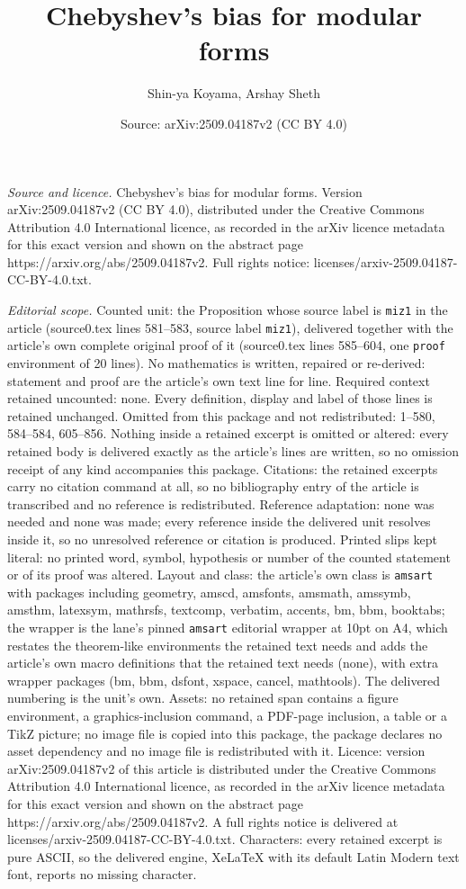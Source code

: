 \documentclass[10pt,a4paper]{amsart}
\title[Chebyshev's bias for modular forms]{Chebyshev's bias for modular forms}
\author{Shin-ya Koyama, Arshay Sheth}
\date{Source: arXiv:2509.04187v2 (CC BY 4.0)}
\begin{document}
\maketitle

\noindent\emph{Source and licence.} Chebyshev's bias for modular forms. Version arXiv:2509.04187v2 (CC BY 4.0), distributed under the Creative Commons Attribution 4.0 International licence, as recorded in the arXiv licence metadata for this exact version and shown on the abstract page https://arxiv.org/abs/2509.04187v2. Full rights notice: licenses/arxiv-2509.04187-CC-BY-4.0.txt.\par\smallskip

\noindent\textit{Editorial scope.} Counted unit: the Proposition whose source label is \texttt{miz1} in the article (source0.tex lines 581--583, source label \texttt{miz1}), delivered together with the article's own complete original proof of it (source0.tex lines 585--604, one \texttt{proof} environment of 20 lines). No mathematics is written, repaired or re-derived: statement and proof are the article's own text line for line. Required context retained uncounted: none. Every definition, display and label of those lines is retained unchanged. Omitted from this package and not redistributed: 1--580, 584--584, 605--856. Nothing inside a retained excerpt is omitted or altered: every retained body is delivered exactly as the article's lines are written, so no omission receipt of any kind accompanies this package. Citations: the retained excerpts carry no citation command at all, so no bibliography entry of the article is transcribed and no reference is redistributed. Reference adaptation: none was needed and none was made; every reference inside the delivered unit resolves inside it, so no unresolved reference or citation is produced. Printed slips kept literal: no printed word, symbol, hypothesis or number of the counted statement or of its proof was altered. Layout and class: the article's own class is \texttt{amsart} with packages including geometry, amscd, amsfonts, amsmath, amssymb, amsthm, latexsym, mathrsfs, textcomp, verbatim, accents, bm, bbm, booktabs; the wrapper is the lane's pinned \texttt{amsart} editorial wrapper at 10pt on A4, which restates the theorem-like environments the retained text needs and adds the article's own macro definitions that the retained text needs (none), with extra wrapper packages (bm, bbm, dsfont, xspace, cancel, mathtools). The delivered numbering is the unit's own. Assets: no retained span contains a figure environment, a graphics-inclusion command, a PDF-page inclusion, a table or a TikZ picture; no image file is copied into this package, the package declares no asset dependency and no image file is redistributed with it. Licence: version arXiv:2509.04187v2 of this article is distributed under the Creative Commons Attribution 4.0 International licence, as recorded in the arXiv licence metadata for this exact version and shown on the abstract page https://arxiv.org/abs/2509.04187v2. A full rights notice is delivered at licenses/arxiv-2509.04187-CC-BY-4.0.txt. Characters: every retained excerpt is pure ASCII, so the delivered engine, XeLaTeX with its default Latin Modern text font, reports no missing character.
\end{document}
